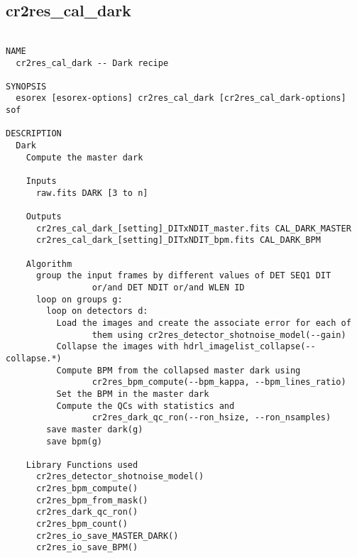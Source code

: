 \subsection{cr2res\_cal\_dark}
\begin{verbatim}

NAME
  cr2res_cal_dark -- Dark recipe

SYNOPSIS
  esorex [esorex-options] cr2res_cal_dark [cr2res_cal_dark-options] sof

DESCRIPTION
  Dark                                                                    
    Compute the master dark                                               
                                                                          
    Inputs                                                                
      raw.fits DARK [3 to n]                               
                                                                          
    Outputs                                                               
      cr2res_cal_dark_[setting]_DITxNDIT_master.fits CAL_DARK_MASTER
      cr2res_cal_dark_[setting]_DITxNDIT_bpm.fits CAL_DARK_BPM
                                                                          
    Algorithm                                                             
      group the input frames by different values of DET SEQ1 DIT          
                 or/and DET NDIT or/and WLEN ID                           
      loop on groups g:                                                   
        loop on detectors d:                                              
          Load the images and create the associate error for each of      
                 them using cr2res_detector_shotnoise_model(--gain)       
          Collapse the images with hdrl_imagelist_collapse(--collapse.*)  
          Compute BPM from the collapsed master dark using                
                 cr2res_bpm_compute(--bpm_kappa, --bpm_lines_ratio)       
          Set the BPM in the master dark                                  
          Compute the QCs with statistics and                             
                 cr2res_dark_qc_ron(--ron_hsize, --ron_nsamples)          
        save master dark(g)                                               
        save bpm(g)                                                       
                                                                          
    Library Functions used                                                
      cr2res_detector_shotnoise_model()                                   
      cr2res_bpm_compute()                                                
      cr2res_bpm_from_mask()                                              
      cr2res_dark_qc_ron()                                                
      cr2res_bpm_count()                                                  
      cr2res_io_save_MASTER_DARK()                                        
      cr2res_io_save_BPM()                                                
  


\end{verbatim}
